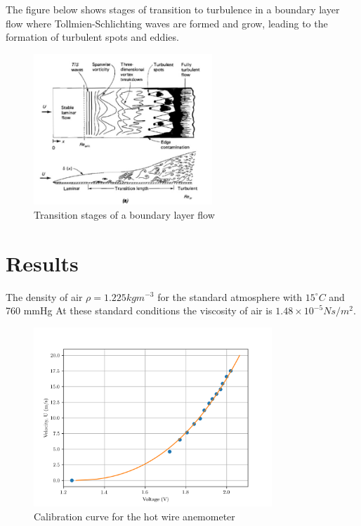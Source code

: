 \documentclass{article}
\begin{document}
The figure below shows stages of transition to turbulence in a boundary layer flow where Tollmien-Schlichting waves are formed and grow, leading to the formation of turbulent spots and eddies.
\begin{figure}[H]
    \centering
    \includegraphics[width=0.6\textwidth]{transition_stages.jpg}
    \caption{Transition stages of a boundary layer flow \cite{textbook}}
    \label{fig:transition_stages}
\end{figure}


\section{Results}

The density of air $\rho = 1.225kgm^{-3}$ for the standard atmosphere with $15^\circ C$ and 760 mmHg
At these standard conditions the viscosity of air is $1.48 \times 10^{-5} Ns/m^2$.

\begin{figure}[H]
    \centering
    \includegraphics[width=0.8\textwidth]{calibration.png}
    \caption{Calibration curve for the hot wire anemometer}
    \label{fig:calibration}
\end{figure}
\end{document}
